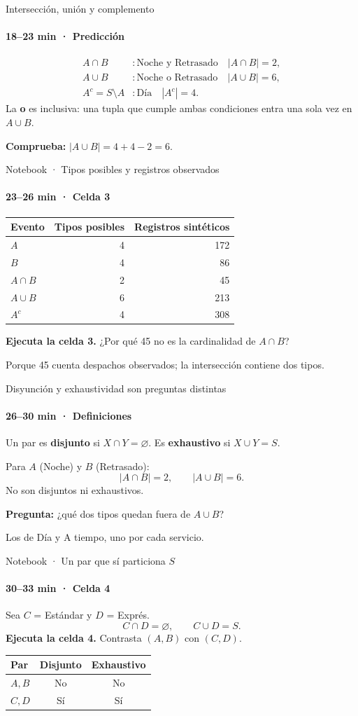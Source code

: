 \documentclass[aspectratio=169,11pt,spanish]{beamer}
\begin{document}
\begin{frame}{Intersección, unión y complemento}
\framesubtitle{18–23 min · Predicción}
\[
\begin{array}{ll}
A\cap B &: \text{Noche y Retrasado}\quad |A\cap B|=2,\\[3pt]
A\cup B &: \text{Noche o Retrasado}\quad |A\cup B|=6,\\[3pt]
A^c=S\setminus A &: \text{Día}\quad |A^c|=4.
\end{array}
\]
La \textbf{o} es inclusiva: una tupla que cumple ambas condiciones entra una sola vez en $A\cup B$.

\medskip
\textbf{Comprueba:} $|A\cup B|=4+4-2=6$.
\end{frame}
\begin{frame}{Notebook · Tipos posibles y registros observados}
\framesubtitle{23–26 min · Celda 3}
\centering
\begin{tabular}{lrr}
\toprule Evento & Tipos posibles & Registros sintéticos\\ \midrule
$A$ & 4 & 172\\
$B$ & 4 & 86\\
$A\cap B$ & 2 & 45\\
$A\cup B$ & 6 & 213\\
$A^c$ & 4 & 308\\ \bottomrule
\end{tabular}
\par\medskip\raggedright
\textbf{Ejecuta la celda 3.} ¿Por qué 45 no es la cardinalidad de $A\cap B$?

\medskip
Porque 45 cuenta despachos observados; la intersección contiene dos tipos.
\end{frame}
\begin{frame}{Disyunción y exhaustividad son preguntas distintas}
\framesubtitle{26–30 min · Definiciones}
Un par es \textbf{disjunto} si $X\cap Y=\varnothing$. Es \textbf{exhaustivo} si $X\cup Y=S$.

\medskip
Para $A$ (Noche) y $B$ (Retrasado):
\[
|A\cap B|=2,\qquad |A\cup B|=6.
\]
No son disjuntos ni exhaustivos.

\medskip
\textbf{Pregunta:} ¿qué dos tipos quedan fuera de $A\cup B$?

\medskip
Los de Día y A tiempo, uno por cada servicio.
\end{frame}
\begin{frame}{Notebook · Un par que sí particiona $S$}
\framesubtitle{30–33 min · Celda 4}
Sea $C$ = Estándar y $D$ = Exprés.
\[
C\cap D=\varnothing,\qquad C\cup D=S.
\]
\textbf{Ejecuta la celda 4.} Contrasta $(A,B)$ con $(C,D)$.

\medskip
\centering
\begin{tabular}{lcc}
\toprule Par & Disjunto & Exhaustivo\\ \midrule
$A,B$ & No & No\\
$C,D$ & Sí & Sí\\ \bottomrule
\end{tabular}
\end{frame}
\end{document}
